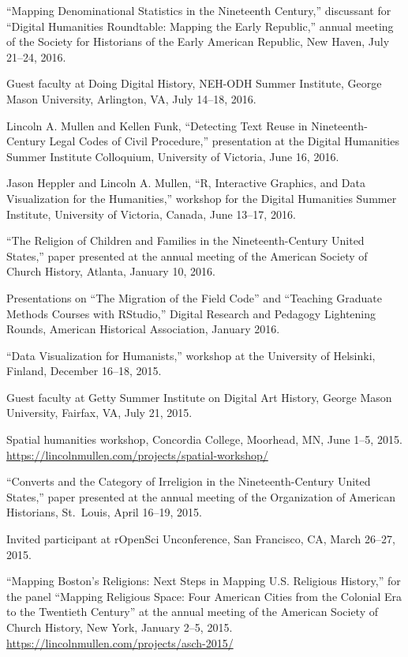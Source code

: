 \documentclass[11pt]{article}
\begin{document}
``Mapping Denominational Statistics in the Nineteenth Century,'' discussant for ``Digital Humanities Roundtable: Mapping the Early Republic,'' annual meeting of the Society for Historians of the Early American Republic, New Haven, July 21--24, 2016.

Guest faculty at Doing Digital History, NEH-ODH Summer Institute, George Mason University, Arlington, VA, July 14--18, 2016.

Lincoln A. Mullen and Kellen Funk, ``Detecting Text Reuse in Nineteenth-Century Legal Codes of Civil Procedure,'' presentation at the Digital Humanities Summer Institute Colloquium, University of Victoria, June 16, 2016.

Jason Heppler and Lincoln A. Mullen, ``R, Interactive Graphics, and Data Visualization for the Humanities,'' workshop for the Digital Humanities Summer Institute, University of Victoria, Canada, June 13--17, 2016.  

``The Religion of Children and Families in the Nineteenth-Century United States,'' paper presented at the annual meeting of the American Society of Church History, Atlanta, January 10, 2016.

Presentations on ``The Migration of the Field Code'' and ``Teaching Graduate Methods Courses with RStudio,'' Digital Research and Pedagogy Lightening Rounds, American Historical Association, January 2016.

``Data Visualization for Humanists,'' workshop at the University of Helsinki, Finland, December 16--18, 2015. 

Guest faculty at Getty Summer Institute on Digital Art History, George Mason University, Fairfax, VA, July 21, 2015.

Spatial humanities workshop, Concordia College, Moorhead, MN, June 1--5, 2015. \url{https://lincolnmullen.com/projects/spatial-workshop/}

``Converts and the Category of Irreligion in the Nineteenth-Century United States,'' paper presented at the annual meeting of the Organization of American Historians, St.~Louis, April 16--19, 2015.

Invited participant at rOpenSci Unconference, San Francisco, CA, March 26--27, 2015.

``Mapping Boston's Religions: Next Steps in Mapping U.S. Religious History,'' for the panel ``Mapping Religious Space: Four American Cities from the Colonial Era to the Twentieth Century'' at the annual meeting of the American Society of Church History, New York, January 2--5, 2015.  
\url{https://lincolnmullen.com/projects/asch-2015/}
\end{document}
